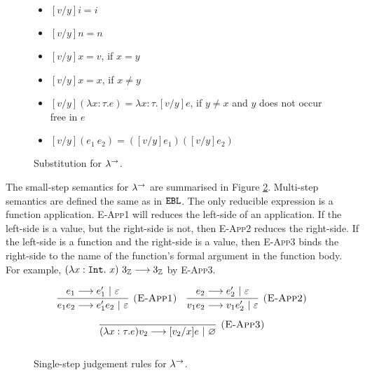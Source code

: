 \begin{figure}[h]


\begin{itemize}
	\setlength\itemsep{-0.7em}
	\item[] $[v/y]i = i$
	\item[] $[v/y]n = n$
	\item[] $[ v/y]x =  v$, if $x = y$
	\item[] $[ v/y]x = x$, if $x \neq y$
	\item[] $[ v/y](\lambda x:  \tau.  e) = \lambda x:  \tau.[ v/y] e$, if $y \neq x$ and $y$ does not occur free in $ e$
	\item[] $[ v/y]( e_1~ e_2) = ([ v/y] e_1)([ v/y] e_2)$
\end{itemize}

\vspace{-12pt}
\caption{Substitution for $\lambda^{\rightarrow}$.}
\label{fig:stlc_sub_defn}
\end{figure}

The small-step semantics for $\lambda^{\rightarrow}$ are summarised in Figure \ref{fig:stlc_dynamic_rules}. Multi-step semantics are defined the same as in $\mathtt{EBL}$. The only reducible expression is a function application. \textsc{E-App1} will reduces the left-side of an application. If the left-side is a value, but the right-side is not, then \textsc{E-App2} reduces the right-side. If the left-side is a function and the right-side is a value, then \textsc{E-App3} binds the right-side to the name of the function's formal argument in the function body. For example, $(\lambda x:\mathtt{Int}.~x)~3_{\mathbb{Z}} \longrightarrow 3_{\mathbb{Z}}$ by \textsc{E-App3}.

\begin{figure}[h]

\noindent
{}

\[
\begin{array}{c}

\infer[\textsc{(E-App1)}]
	{ e_1  e_2 \longrightarrow  e_1'  e_2~|~\varepsilon}
	{ e_1 \longrightarrow  e_1'~|~\varepsilon}
	~~~
\infer[\textsc{(E-App2)}]
	{ v_1  e_2 \longrightarrow  v_1  e_2'~|~\varepsilon} 
	{ e_2 \longrightarrow  e_2'~|~\varepsilon}\\[2ex]
	
\infer[\textsc{(E-App3)}]
	{ (\lambda x:  \tau. e)  v_2 \longrightarrow [ v_2/x] e~|~\varnothing }
	{}\\[2ex]
	
\end{array}
\]

\vspace{-12pt}
\caption{Single-step judgement rules for $\lambda^{\rightarrow}$.}
\label{fig:stlc_dynamic_rules}
\end{figure}

